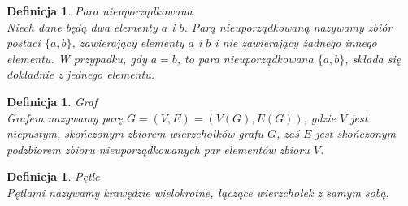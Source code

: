 \documentclass[12pt,a4paper]{report}
\newtheorem{definition}[theorem]{Definicja}
\begin{document}
\begin{definition}{Para nieuporządkowana \cite[w oparciu o rozdział 3]{kuratowski2004}\\}
Niech dane będą dwa elementy $a$ i $b$. Parą nieuporządkowaną nazywamy zbiór postaci $\{a,b\}$, zawierający elementy $a$ i $b$ i nie zawierający żadnego innego elementu. W przypadku, gdy $a=b$, to para nieuporządkowana $\{a,b\}$, składa się dokładnie z jednego elementu.

\end{definition}


\begin{definition}{Graf \cite[w oparciu o rozdział 2]{wilson2008}\\}
Grafem nazywamy parę $G=(V,E)=(V(G),E(G))$, gdzie $V$ jest niepustym, skończonym zbiorem wierzchołków grafu $G$, zaś $E$ jest skończonym podzbiorem zbioru nieuporządkowanych par elementów zbioru $V$.
\end{definition}


\begin{definition}{Pętle \cite[Rozdział 2]{wilson2008}\\}
Pętlami nazywamy krawędzie wielokrotne, łączące wierzchołek z samym sobą.\\
\end{definition}

\end{document}
